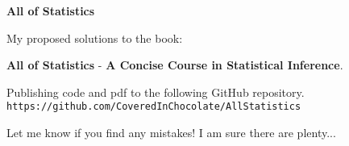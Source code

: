 \noindent
{\Huge \textbf{All of Statistics}}

\bigskip\noindent
My proposed solutions to the book:

\medskip\noindent
{\Large\textbf{All of Statistics}} - \textbf{A Concise Course in Statistical Inference}.%

\medskip\noindent
Publishing code and pdf to the following GitHub repository.\\
\texttt{https://github.com/CoveredInChocolate/AllStatistics}

\bigskip\noindent
Let me know if you find any mistakes! I am sure there are plenty...

\tableofcontents